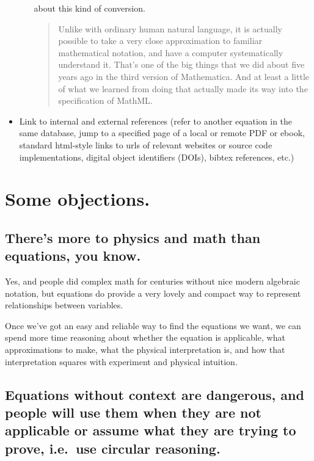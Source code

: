 \documentclass[12pt,letterpaper]{article}
\begin{document}
\begin{itemize}
\begin{enumerate}
            about this kind of conversion.
                \begin{quote}
                Unlike with ordinary human natural language,
                it is actually possible to take a very close approximation to familiar mathematical notation,
                and have a computer systematically understand it.
                That's one of the big things that we did about five years ago in the third version of Mathematica.
                And at least a little of what we learned from doing that actually made its way into the specification of MathML.
                \end{quote}
      \end{enumerate}
\item Link to internal and external references
      (refer to another equation in the same database,
      jump to a specified page of a local or remote PDF or ebook,
      standard html-style links to  urls of relevant websites or source code implementations,
      digital object identifiers (DOIs),
      bibtex references, etc.) \label{itm:linking}
\end{itemize}

\section{Some objections.}

\subsection{There's more to physics and math than equations, you know.}

Yes, and people did complex math for centuries without nice modern algebraic notation,
but equations do provide a very lovely and compact way to represent relationships between variables.

Once we've got an easy and reliable way to find the equations we want,
we can spend more time reasoning about whether the equation is applicable,
what approximations to make,
what the physical interpretation is,
and how that interpretation squares with experiment and physical intuition.

\subsection{Equations without context are dangerous,
            and people will use them when they are not applicable or assume what they are trying to prove,
            i.e.\ use circular reasoning.}
\end{document}
